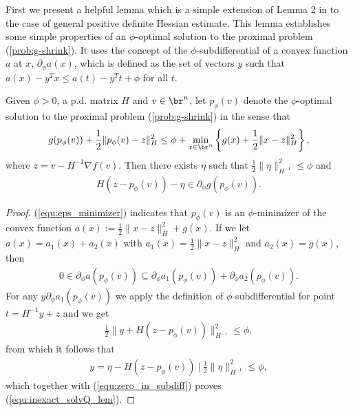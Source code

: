\documentclass[11pt]{article}
\numberwithin{equation}{section}
\begin{document}
First we present a helpful lemma which is a simple extension of Lemma 2 in \cite{Schmidtetal} to the case of general positive definite Hessian estimate. This lemma establishes some simple properties of an $\phi$-optimal solution to the proximal problem (\ref{prob:g-shrink}).  It uses the concept of the $\phi$-subdifferential of a convex function $a$ at $x$, 
$\partial_{\phi} a(x)$, which is defined as the set of vectors $y$ such that $a(x) - y^Tx \leq a(t) - y^Tt + \phi$ for all $t$. 
\begin{lemma}
    \label{lem:inexact_1st_opt_cond}
    Given $\phi >0$, a p.d. matrix $H$ and $v\in \br^n$, let $p_{\phi}(v)$ denote the $\phi$-optimal solution to the proximal problem (\ref{prob:g-shrink}) in the sense that
    \begin{align}
        \label{equ:eps_minimizer}
        g(p_{\phi}(v))+\frac{1}{2}\|p_{\phi}(v)-z\|_H^2 \leq \phi +
        \min_{x\in\br^n}\left\{g(x)+\frac{1}{2}\|x-z\|_H^2 \right\},
    \end{align}
    where $z = v - H^{-1} \nabla f(v)$. Then there exists $\eta$ such that $\frac{1}{2} \| \eta \|^2_{H^{-1}} \leq \phi$ and
    \begin{align}
        \label{equ:inexact_solvQ_lem}
        H(z-p_{\phi}(v))  - \eta \in \partial_{\phi}g(p_{\phi}(v)).
    \end{align}
\end{lemma}


\begin{proof}
    (\ref{equ:eps_minimizer}) indicates that $p_{\phi}(v)$ is an $\phi$-minimizer of the convex function $a(x) := \frac{1}{2}\|x-z\|_H^2+g(x)$. If we let $a(x)=a_1(x)+a_2(x)$ with $a_1(x) = \frac{1}{2}\|x-z\|_H^2$ and $a_2(x) = g(x)$, then 
    \begin{align}
        \label{equ:zero_in_subdiff}
        0 \in \partial_{\phi} a(p_{\phi}(v)) \subseteq \partial_{\phi} a_1(p_{\phi}(v)) + \partial_{\phi} a_2(p_{\phi}(v)).
    \end{align}
    For any $y\partial_{\phi} a_1(p_{\phi}(v))$ we apply the definition of  $\phi$-subdifferential for point $t=H^{-1}y+z$ and we get 
    \begin{align*}
      \frac{1}{2} \| y + H(z-p_{\phi}(v)) \|^2_{H^{-1}} \leq \phi,
      \end{align*}
      from which it follows that 
       \begin{align*}
       y = \eta - H(z-p_{\phi}(v)) ~|~ \frac{1}{2} \|\eta\|^2_{H^{-1}} \leq \phi, 
    \end{align*}
    which together with  (\ref{equ:zero_in_subdiff}) proves 
   (\ref{equ:inexact_solvQ_lem}).
   
\end{proof}
\end{document}
